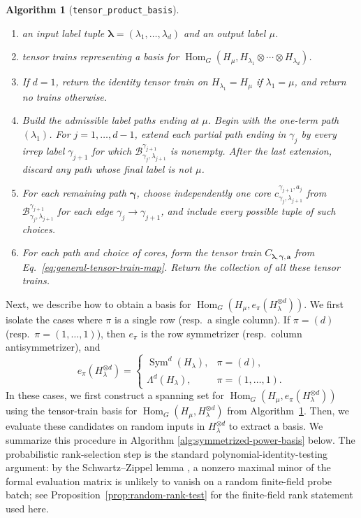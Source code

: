 \documentclass[11pt]{article}
\newcommand{\scB}{\mathcal{B}}
\newcommand{\HomG}[2]{\operatorname{Hom}_G\!\left(#1,#2\right)}
\newcommand{\Sym}{\operatorname{Sym}}
\newtheorem{algorithm}[theorem]{Algorithm}
\theoremstyle{definition}
\begin{document}
\begin{algorithm}[\texttt{tensor\_product\_basis}]\label{alg:tensor-product-basis}
  \phantom{}
  \begin{enumerate}[label=\textbf{Step \arabic*.},leftmargin=2.8cm]
    \item[\textbf{Input:}] an input label tuple $\boldsymbol{\lambda}=(\lambda_1,\dots,\lambda_d)$ and an output label $\mu$.
    \item[\textbf{Output:}] tensor trains representing a basis for $\HomG{H_\mu}{H_{\lambda_1}\otimes\cdots\otimes H_{\lambda_d}}$.
    \item If $d=1$, return the identity tensor train on $H_{\lambda_1}=H_\mu$ if $\lambda_1=\mu$, and return no trains otherwise.
    \item Build the admissible label paths ending at $\mu$.  Begin with the one-term path $(\lambda_1)$.  For $j=1,\dots,d-1$, extend each partial path ending in $\gamma_j$ by every irrep label $\gamma_{j+1}$ for which $\scB_{\gamma_j,\lambda_{j+1}}^{\gamma_{j+1}}$ is nonempty.  After the last extension, discard any path whose final label is not $\mu$.
    \item For each remaining path $\boldsymbol{\gamma}$, choose independently one core $c_{\gamma_j,\lambda_{j+1}}^{\gamma_{j+1},a_j}$ from $\scB_{\gamma_j,\lambda_{j+1}}^{\gamma_{j+1}}$ for each edge $\gamma_j\to\gamma_{j+1}$, and include every possible tuple of such choices.
    \item For each path and choice of cores, form the tensor train $C_{\boldsymbol{\lambda},\boldsymbol{\gamma},\boldsymbol{a}}$ from Eq.~\eqref{eq:general-tensor-train-map}.  Return the collection of all these tensor trains.
  \end{enumerate}
\end{algorithm}

Next, we describe how to obtain a basis for $\HomG{H_\mu}{e_\pi(H_\lambda^{\otimes d})}$.
We first isolate the cases where $\pi$ is a single row (resp.~a single column).  If $\pi=(d)$ (resp.~$\pi=(1,\dots,1)$), then $e_\pi$ is the row symmetrizer (resp.~column antisymmetrizer), and
\[
  e_\pi(H_\lambda^{\otimes d})
  =
  \begin{cases}
    \Sym^d(H_\lambda), & \pi=(d),\\
    \Lambda^d(H_\lambda), & \pi=(1,\dots,1).
  \end{cases}
\]
In these cases, we first construct a spanning set for $\HomG{H_\mu}{e_\pi(H_\lambda^{\otimes d})}$ using the tensor-train basis for $\HomG{H_\mu}{H_\lambda^{\otimes d}}$ from Algorithm~\ref{alg:tensor-product-basis}. Then, we evaluate these candidates on random inputs in $H_\lambda^{\otimes d}$ to extract a basis.  We summarize this procedure in Algorithm \ref{alg:symmetrized-power-basis} below.
The probabilistic rank-selection step is the standard polynomial-identity-testing argument: by the Schwartz--Zippel lemma \cite{Schwartz1980,Zippel1979}, a nonzero maximal minor of the formal evaluation matrix is unlikely to vanish on a random finite-field probe batch; see Proposition~\ref{prop:random-rank-test} for the finite-field rank statement used here.
\end{document}
